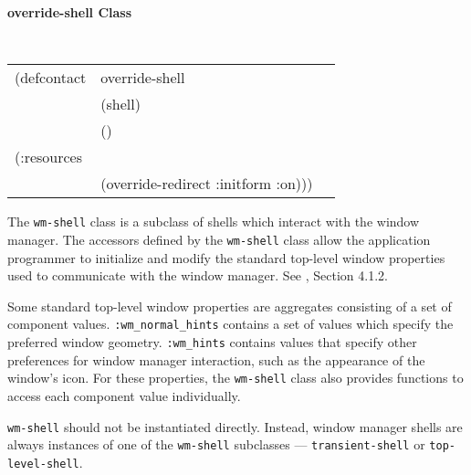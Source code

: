\documentclass[twoside]{book}
\begin{document}
\begin{sloppy}
{\samepage 
{\large {\bf override-shell \hfill Class}} 
\begin{flushright} \parbox[t]{6.125in}{
\tt
\begin{tabular}{lll}
\raggedright
(defcontact &override-shell\\
&  (shell)\\
&  () \\
(:resources \\
&    (override-redirect :initform :on))) 									     
\end{tabular}
\rm
}\end{flushright}}





The {\tt wm-shell} class is a subclass of shells which interact with the
window manager. The accessors defined by the {\tt wm-shell} class allow
the application programmer to initialize and modify the standard
top-level window properties used to communicate with the window
manager. See \cite{icccm}, Section 4.1.2.

Some standard top-level window properties are aggregates consisting of a set of
component values. {\tt :wm\-\_normal\-\_hints} contains a set of values which
specify the preferred window geometry. {\tt :wm\_hints} contains values that
specify other preferences for window manager interaction, such as the appearance
of the window's icon. For these properties, the {\tt wm-shell} class also
provides functions to access each component value individually. 


{\tt wm-shell} should not be instantiated directly. Instead, window
manager shells are always instances of one of the {\tt wm-shell}
subclasses --- {\tt transient-shell} or {\tt top-level-shell}.


\end{sloppy}
\end{document}
